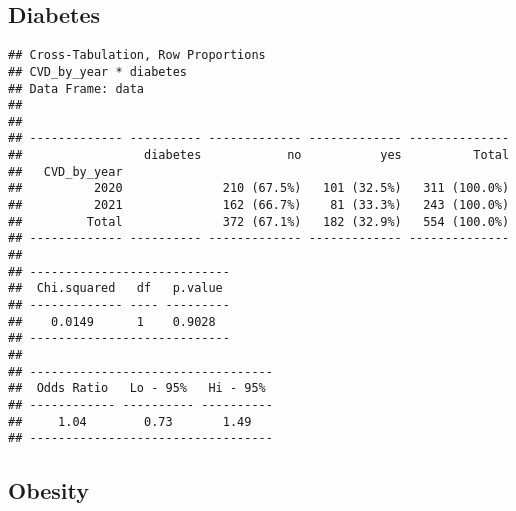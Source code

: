\documentclass[
]{article}
\newenvironment{Shaded}{\begin{snugshade}}{\end{snugshade}}
\newcommand{\AttributeTok}[1]{\textcolor[rgb]{0.13,0.29,0.53}{#1}}
\newcommand{\ConstantTok}[1]{\textcolor[rgb]{0.56,0.35,0.01}{#1}}
\newcommand{\FunctionTok}[1]{\textcolor[rgb]{0.13,0.29,0.53}{\textbf{#1}}}
\newcommand{\NormalTok}[1]{#1}
\newcommand{\SpecialCharTok}[1]{\textcolor[rgb]{0.81,0.36,0.00}{\textbf{#1}}}
\newcommand{\StringTok}[1]{\textcolor[rgb]{0.31,0.60,0.02}{#1}}
\begin{document}
\hypertarget{diabetes}{%
\subsection{Diabetes}\label{diabetes}}

\begin{Shaded}
\end{Shaded}

\begin{verbatim}
## Cross-Tabulation, Row Proportions  
## CVD_by_year * diabetes  
## Data Frame: data  
## 
## 
## ------------- ---------- ------------- ------------- --------------
##                 diabetes            no           yes          Total
##   CVD_by_year                                                      
##          2020              210 (67.5%)   101 (32.5%)   311 (100.0%)
##          2021              162 (66.7%)    81 (33.3%)   243 (100.0%)
##         Total              372 (67.1%)   182 (32.9%)   554 (100.0%)
## ------------- ---------- ------------- ------------- --------------
## 
## ----------------------------
##  Chi.squared   df   p.value 
## ------------- ---- ---------
##    0.0149      1    0.9028  
## ----------------------------
## 
## ----------------------------------
##  Odds Ratio   Lo - 95%   Hi - 95% 
## ------------ ---------- ----------
##     1.04        0.73       1.49   
## ----------------------------------
\end{verbatim}

\hypertarget{obesity}{%
\subsection{Obesity}\label{obesity}}

\begin{Shaded}
\end{Shaded}
\end{document}
